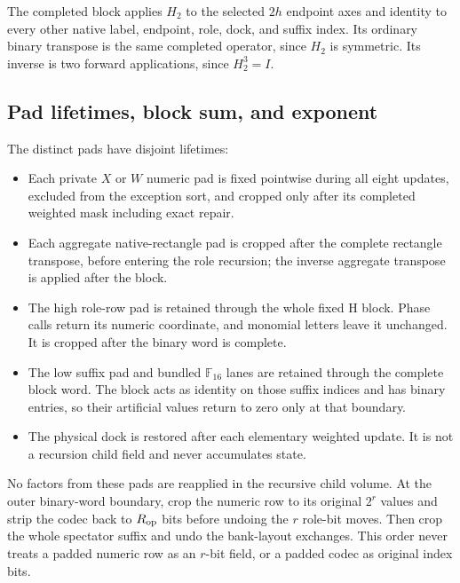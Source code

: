 The completed block applies $H_2$ to the selected $2h$ endpoint axes and
identity to every other native label, endpoint, role, dock, and suffix
index.  Its ordinary binary transpose is the same completed operator,
since $H_2$ is symmetric.  Its inverse is two forward applications,
since $H_2^3=I$.

\subsection{Pad lifetimes, block sum, and exponent}

The distinct pads have disjoint lifetimes:
\begin{itemize}
 \item Each private $X$ or $W$ numeric pad is fixed pointwise during all
   eight updates, excluded from the exception sort, and cropped only
   after its completed weighted mask including exact repair.
 \item Each aggregate native-rectangle pad is cropped after the complete
   rectangle transpose, before entering the role recursion; the inverse
   aggregate transpose is applied after the block.
 \item The high role-row pad is retained through the whole fixed H block.
   Phase calls return its numeric coordinate, and monomial letters leave
   it unchanged. It is cropped after the binary word is complete.
 \item The low suffix pad and bundled $\mathbb F_{16}$ lanes are retained
   through the complete block word.  The block acts as identity on those
   suffix indices and has binary entries, so their artificial values
   return to zero only at that boundary.
 \item The physical dock is restored after each elementary weighted
   update.  It is not a recursion child field and never accumulates state.
\end{itemize}
No factors from these pads are reapplied in the recursive child volume.
At the outer binary-word boundary, crop the numeric row to its original
$2^r$ values and strip the codec back to $R_{\rm op}$ bits before
undoing the $r$ role-bit moves. Then crop the whole spectator suffix
and undo the bank-layout exchanges. This order never treats a padded
numeric row as an $r$-bit field, or a padded codec as original index bits.

